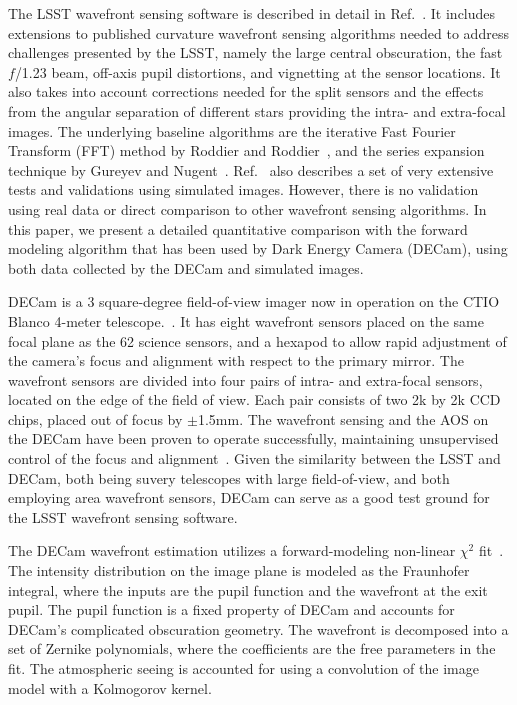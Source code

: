 \documentclass[]{spie}  %
\begin{document}
The LSST wavefront sensing software is described in detail in Ref.~.
It includes extensions to published curvature wavefront sensing algorithms needed
to address challenges presented by the LSST, namely the large central
obscuration, the fast $f$/1.23 beam, off-axis pupil distortions, and vignetting
at the sensor locations. It also takes into account corrections needed for the
split sensors and the effects from the angular separation of different
stars providing the intra- and extra-focal images.
The underlying baseline algorithms are the iterative Fast Fourier 
Transform (FFT) method by Roddier and Roddier~\cite{Roddier93}, and
the series expansion technique by Gureyev and Nugent~\cite{GuNu96}.
Ref.~ also describes a set of very extensive tests and validations using simulated images.
However, there is no validation using real data or direct comparison to other wavefront sensing algorithms. In this paper, we present a detailed quantitative comparison with the forward modeling algorithm that has been used by Dark Energy Camera (DECam), using both data collected by the DECam and simulated images.

DECam is a 3 square-degree field-of-view imager now in operation on the CTIO Blanco 4-meter telescope.~\cite{DECamStatus}. It has eight wavefront sensors placed on the same focal plane as the 62 science sensors, and a hexapod to allow rapid adjustment of the camera's focus and alignment with respect to the primary mirror.
The wavefront sensors are divided into four pairs of intra- and extra-focal sensors, located on the edge of the field of view. Each pair consists of two 2k by 2k CCD chips, placed out of focus by $\pm$1.5mm.
The wavefront sensing and the AOS on the DECam have been proven to operate successfully, maintaining unsupervised control of the focus and alignment~\cite{roodman14}.
Given the similarity between the LSST and DECam, both being suvery telescopes with large field-of-view, and both employing area wavefront sensors, DECam can serve as a good test ground for the LSST wavefront sensing software. 

The DECam wavefront estimation utilizes a forward-modeling non-linear $\chi^2$ fit~\cite{roodman14}. The intensity distribution on the image plane is modeled as the Fraunhofer integral, where the inputs are the pupil function and the wavefront at the exit pupil. The pupil function is a fixed property of DECam and accounts for DECam's complicated obscuration geometry. The wavefront is decomposed into a set of Zernike polynomials, where the coefficients are the free parameters in the fit. The atmospheric seeing is accounted for using a convolution of the image model with a Kolmogorov kernel.
\end{document}

